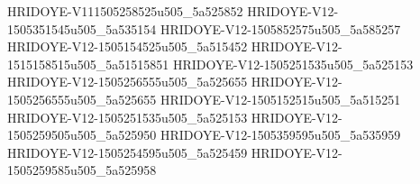 HRIDOYE-V111505258525u505_5a525852
HRIDOYE-V12-1505351545u505_5a535154
HRIDOYE-V12-1505852575u505_5a585257 
HRIDOYE-V12-1505154525u505_5a515452
HRIDOYE-V12-1515158515u505_5a51515851
HRIDOYE-V12-1505251535u505_5a525153
HRIDOYE-V12-1505256555u505_5a525655
HRIDOYE-V12-1505256555u505_5a525655
HRIDOYE-V12-1505152515u505_5a515251
HRIDOYE-V12-1505251535u505_5a525153
HRIDOYE-V12-1505259505u505_5a525950
HRIDOYE-V12-1505359595u505_5a535959
HRIDOYE-V12-1505254595u505_5a525459
HRIDOYE-V12-1505259585u505_5a525958
